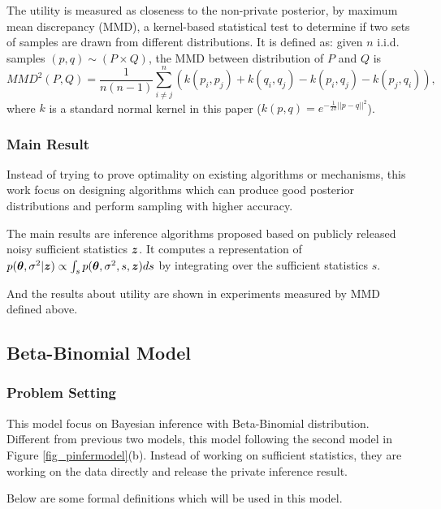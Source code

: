 \documentclass{article}
\begin{document}
\begin{defn}
The utility is measured as closeness to the non-private posterior, by maximum mean discrepancy (MMD), a kernel-based statistical test to determine if two sets of samples are drawn from different distributions. It is defined as: given $n$ i.i.d. samples $(p, q) \sim (P \times Q)$, the MMD between distribution of $P$ and $Q$ is
\[
	MMD^2(P, Q) = \frac{1}{n(n - 1)}
	\sum_{i \neq j}^{n}
	(k(p_i, p_j ) + k(q_i, q_j ) 
	- k(p_i, q_j ) - k(p_j , q_i)),
\]
where $k$ is a standard normal kernel in this paper 
($k(p, q ) = e^{-\frac{1}{2\pi}||p - q||^2}$).
\end{defn}
%
%
\subsubsection{Main Result}
%
Instead of trying to prove optimality on existing algorithms or mechanisms, this work focus on designing algorithms which can produce good posterior distributions and perform sampling with higher accuracy.
%

The main results are inference algorithms proposed based on publicly released noisy sufficient statistics $\boldsymbol{z}$. 
It computes a representation of
$ p(\boldsymbol{\theta}, \sigma^2 | \boldsymbol{z}) \propto \int_{s}   p( \boldsymbol{\theta}, \sigma^2, s, \boldsymbol{z}) ds$ by integrating over the sufficient statistics $s$.

%
%
And the results about utility are shown in experiments measured by MMD defined above.

\subsection{Beta-Binomial Model
\texorpdfstring{\cite{Zhang2017privbayes}}{}}
\label{sec_betabi}
%

\subsubsection{Problem Setting}
%
This model focus on Bayesian inference with Beta-Binomial distribution.
%
Different from previous two models, this model following the second model in Figure \ref{fig_pinfermodel}(b). Instead of working on sufficient statistics, they are working on the data directly and release the private inference result. 

%
Below are some formal definitions which will be used in this model.
\end{document}
